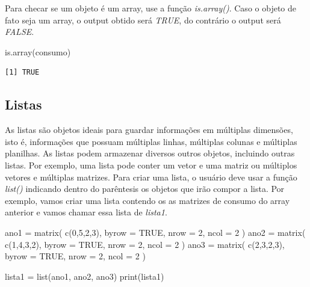 \documentclass[
  letterpaper,
  DIV=11,
  numbers=noendperiod]{scrreprt}
\newenvironment{Shaded}{\begin{snugshade}}{\end{snugshade}}
\newcommand{\AttributeTok}[1]{\textcolor[rgb]{0.40,0.45,0.13}{#1}}
\newcommand{\ConstantTok}[1]{\textcolor[rgb]{0.56,0.35,0.01}{#1}}
\newcommand{\DecValTok}[1]{\textcolor[rgb]{0.68,0.00,0.00}{#1}}
\newcommand{\FunctionTok}[1]{\textcolor[rgb]{0.28,0.35,0.67}{#1}}
\newcommand{\NormalTok}[1]{\textcolor[rgb]{0.00,0.23,0.31}{#1}}
\newcommand{\OtherTok}[1]{\textcolor[rgb]{0.00,0.23,0.31}{#1}}
\begin{document}
Para checar se um objeto é um array, use a função \emph{is.array()}.
Caso o objeto de fato seja um array, o output obtido será \emph{TRUE},
do contrário o output será \emph{FALSE}.

\begin{Shaded}
\begin{Highlighting}[]
\FunctionTok{is.array}\NormalTok{(consumo)}
\end{Highlighting}
\end{Shaded}

\begin{verbatim}
[1] TRUE
\end{verbatim}

\subsection{Listas}\label{listas}

As listas são objetos ideais para guardar informações em múltiplas
dimensões, isto é, informações que possuam múltiplas linhas, múltiplas
colunas e múltiplas planilhas. As listas podem armazenar diversos outros
objetos, incluindo outras listas. Por exemplo, uma lista pode conter um
vetor e uma matriz ou múltiplos vetores e múltiplas matrizes. Para criar
uma lista, o usuário deve usar a função \emph{list()} indicando dentro
do parêntesis os objetos que irão compor a lista. Por exemplo, vamos
criar uma lista contendo os as matrizes de consumo do array anterior e
vamos chamar essa lista de \emph{lista1}.

\begin{Shaded}
\begin{Highlighting}[]
\NormalTok{ano1 }\OtherTok{=} \FunctionTok{matrix}\NormalTok{(}
  \FunctionTok{c}\NormalTok{(}\DecValTok{0}\NormalTok{,}\DecValTok{5}\NormalTok{,}\DecValTok{2}\NormalTok{,}\DecValTok{3}\NormalTok{), }\AttributeTok{byrow =} \ConstantTok{TRUE}\NormalTok{, }\AttributeTok{nrow =} \DecValTok{2}\NormalTok{, }\AttributeTok{ncol =} \DecValTok{2}
\NormalTok{)}
\NormalTok{ano2 }\OtherTok{=} \FunctionTok{matrix}\NormalTok{(}
  \FunctionTok{c}\NormalTok{(}\DecValTok{1}\NormalTok{,}\DecValTok{4}\NormalTok{,}\DecValTok{3}\NormalTok{,}\DecValTok{2}\NormalTok{), }\AttributeTok{byrow =} \ConstantTok{TRUE}\NormalTok{, }\AttributeTok{nrow =} \DecValTok{2}\NormalTok{, }\AttributeTok{ncol =} \DecValTok{2}
\NormalTok{)}
\NormalTok{ano3 }\OtherTok{=} \FunctionTok{matrix}\NormalTok{(}
  \FunctionTok{c}\NormalTok{(}\DecValTok{2}\NormalTok{,}\DecValTok{3}\NormalTok{,}\DecValTok{2}\NormalTok{,}\DecValTok{3}\NormalTok{), }\AttributeTok{byrow =} \ConstantTok{TRUE}\NormalTok{, }\AttributeTok{nrow =} \DecValTok{2}\NormalTok{, }\AttributeTok{ncol =} \DecValTok{2}
\NormalTok{)}

\NormalTok{lista1 }\OtherTok{=} \FunctionTok{list}\NormalTok{(ano1, ano2, ano3)}
\FunctionTok{print}\NormalTok{(lista1)}
\end{Highlighting}
\end{Shaded}
\end{document}
